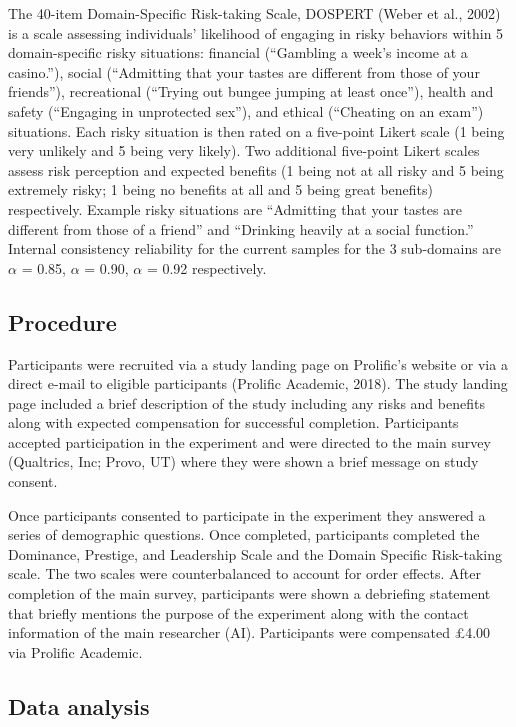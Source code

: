 \documentclass[
  donotrepeattitle,doc, 12pt, a4paper,floatsintext]{apa7}
\begin{document}
The 40-item Domain-Specific Risk-taking Scale, DOSPERT (Weber et al., 2002) is a scale assessing individuals' likelihood of engaging in risky behaviors within 5 domain-specific risky situations: financial (``Gambling a week's income at a casino.''), social (``Admitting that your tastes are different from those of your friends''), recreational (``Trying out bungee jumping at least once''), health and safety (``Engaging in unprotected sex''), and ethical (``Cheating on an exam'') situations. Each risky situation is then rated on a five-point Likert scale (1 being very unlikely and 5 being very likely). Two additional five-point Likert scales assess risk perception and expected benefits (1 being not at all risky and 5 being extremely risky; 1 being no benefits at all and 5 being great benefits) respectively. Example risky situations are ``Admitting that your tastes are different from those of a friend'' and ``Drinking heavily at a social function.'' Internal consistency reliability for the current samples for the 3 sub-domains are \(\alpha\) = 0.85, \(\alpha\) = 0.90, \(\alpha\) = 0.92 respectively.

\hypertarget{procedure}{%
\subsection{Procedure}\label{procedure}}

Participants were recruited via a study landing page on Prolific's website or via a direct e-mail to eligible participants (Prolific Academic, 2018). The study landing page included a brief description of the study including any risks and benefits along with expected compensation for successful completion. Participants accepted participation in the experiment and were directed to the main survey (Qualtrics, Inc; Provo, UT) where they were shown a brief message on study consent.

Once participants consented to participate in the experiment they answered a series of demographic questions. Once completed, participants completed the Dominance, Prestige, and Leadership Scale and the Domain Specific Risk-taking scale. The two scales were counterbalanced to account for order effects. After completion of the main survey, participants were shown a debriefing statement that briefly mentions the purpose of the experiment along with the contact information of the main researcher (AI). Participants were compensated £4.00 via Prolific Academic.

\hypertarget{data-analysis}{%
\subsection{Data analysis}\label{data-analysis}}
\end{document}
